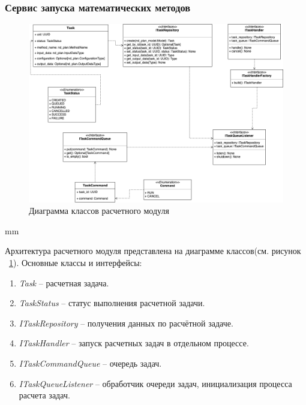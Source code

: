 \subsubsection{{Сервис запуска математических методов}}

\begin{figure}[H]
	\includegraphics[width=\textwidth]{architecture/pictures/executor/execution_classes_diagram}
	\caption{Диаграмма классов расчетного модуля}
	\label{pic:architecture__execution-classes-diagram}
\end{figure}
 mm

Архитектура расчетного модуля представлена на диаграмме классов(см. рисунок \ \ref{pic:architecture__execution-classes-diagram}).
Основные классы и интерфейсы:
\begin{enumerate}
	\item \textit{Task} -- расчетная задача.
	\item \textit{TaskStatus} -- статус выполнения расчетной задачи.
	\item \textit{ITaskRepository} -- получения данных по расчётной задаче.
	\item \textit{ITaskHandler} -- запуск расчетных задач в отдельном процессе.
	\item \textit{ITaskCommandQueue} -- очередь задач.
	\item \textit{ITaskQueueListener} -- обработчик очереди задач, инициализация процесса расчета задач.
\end{enumerate}


